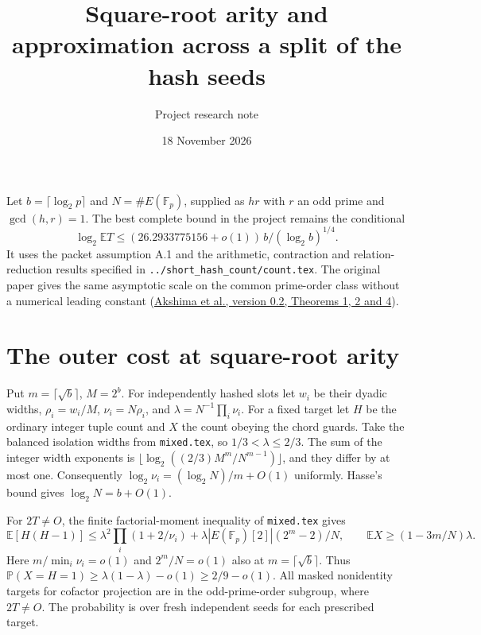 \documentclass[11pt]{article}
\title{Square-root arity and approximation across a split of the hash seeds}
\author{Project research note}
\date{18 November 2026}
\newcommand{\E}{\mathbb E}
\newcommand{\Prob}{\mathbb P}
\begin{document}
\maketitle

Let $b=\lceil\log_2p\rceil$ and $N=\#E(\mathbb F_p)$, supplied as $hr$
with $r$ an odd prime and $\gcd(h,r)=1$. The best complete bound in the
project remains the conditional
\[
 \log_2\E T\le (26.2933775156+o(1))\,b/(\log_2 b)^{1/4}.
\]
It uses the packet assumption A.1 and the arithmetic, contraction and
relation-reduction results specified in \texttt{../short\_hash\_count/count.tex}.
The original paper gives the same asymptotic scale on the common
prime-order class without a numerical leading constant
(\href{https://github.com/bochum-crypto/subexponential-ecdl/blob/main/subexponential-ecdl.pdf}
{Akshima et al., version 0.2, Theorems 1, 2 and 4}).

\section{The outer cost at square-root arity}
Put $m=\lceil\sqrt b\rceil$, $M=2^b$. For independently hashed slots let
$w_i$ be their dyadic widths, $\rho_i=w_i/M$, $\nu_i=N\rho_i$, and
$\lambda=N^{-1}\prod_i\nu_i$. For a fixed target let $H$ be the
ordinary integer tuple count and $X$ the count obeying the chord guards.
Take the balanced isolation widths from \texttt{mixed.tex}, so
$1/3<\lambda\le2/3$. The sum of the integer width exponents is
$\lfloor\log_2((2/3)M^m/N^{m-1})\rfloor$, and they differ by at most one.
Consequently $\log_2\nu_i=(\log_2 N)/m+O(1)$ uniformly.
Hasse's bound gives $\log_2 N=b+O(1)$.

For $2T\ne O$, the finite factorial-moment inequality of \texttt{mixed.tex} gives
\[
 \E[H(H-1)]\le\lambda^2\prod_i(1+2/\nu_i)
       +\lambda |E(\mathbb F_p)[2]|(2^m-2)/N,\qquad
 \E X\ge(1-3m/N)\lambda .
\]
Here $m/\min_i\nu_i=o(1)$ and $2^m/N=o(1)$ also at $m=\lceil\sqrt b\rceil$.
Thus $\Prob(X=H=1)\ge\lambda(1-\lambda)-o(1)\ge2/9-o(1)$.
All masked nonidentity targets for cofactor projection are in the
odd-prime-order subgroup, where $2T\ne O$. The probability is over
fresh independent seeds for each prescribed target.
\end{document}
